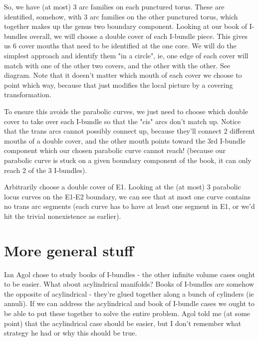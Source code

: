 \documentclass[12pt]{amsart}
\theoremstyle{definition}
\begin{document}
So, we have (at most) 3 arc families on each punctured torus. These are
identified, somehow, with 3 arc families on the other punctured torus, which
together makes up the genus two boundary component. Looking at our book of
I-bundles overall, we will choose a double cover of each I-bundle piece. This
gives us 6 cover mouths that need to be identified at the one core. We will do
the simplest approach and identify them "in a circle", ie, one edge of each
cover will match with one of the other two covers, and the other with the
other. See diagram. Note that it doesn't matter which mouth of each cover we
choose to point which way, because that just modifies the local picture by
a covering transformation.

To ensure this avoids the parabolic curves, we just need to choose which double
cover to take over each I-bundle so that the "cis" arcs don't match up. Notice
that the trans arcs cannot possibly connect up, because they'll connect
2 different mouths of a double cover, and the other mouth points toward the 3rd
I-bundle component which our chosen parabolic curve cannot reach! (because our
parabolic curve is stuck on a given boundary component of the book, it can only
reach 2 of the 3 I-bundles).

Arbitrarily choose a double cover of E1. Looking at the (at most) 3 parabolic
locus curves on the E1-E2 boundary, we can see that at most one curve contains
no trans arc segments (each curve has to have at least one segment in E1, or
we'd hit the trivial nonexistence as earlier).

\section{More general stuff}

Ian Agol chose to study books of I-bundles - the other infinite volume cases
ought to be easier. What about acylindrical manifolds? Books of I-bundles are
somehow the opposite of acylindrical - they're glued together along a bunch of
cylinders (ie annuli). If we can address the acylindrical and book of I-bundle
cases we ought to be able to put these together to solve the entire problem.
Agol told me (at some point) that the acylindrical case should be easier, but
I don't remember what strategy he had or why this should be true.




\end{document}
